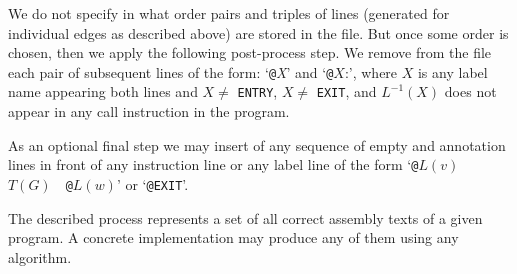 \documentclass[10pt,twocolumn]{article}
\begin{document}
We do not specify in what order pairs and triples of lines (generated for
individual edges as described above) are stored in the file. But once some order
is chosen, then we apply the following post-process step. We remove from the
file each pair of subsequent lines of the form: `\texttt{@}\textit{X}' and
`\texttt{@}$ X $:', where $ X $ is any label name appearing both lines and $ X
\ne $ \texttt{ENTRY}, $ X \ne $ \texttt{EXIT}, and $ L^{-1}(X) $ does not appear
in any call instruction in the program.

As an optional final step we may insert of any sequence of empty and annotation
lines in front of any instruction line or any label line of the form
`\texttt{@}$ L(v) $~~$ T(G) $~~\texttt{@}$ L(w) $' or `\texttt{@EXIT}'.

The described process represents a set of all correct assembly texts of a given
program. A concrete implementation may produce any of them using any algorithm.
\end{document}
